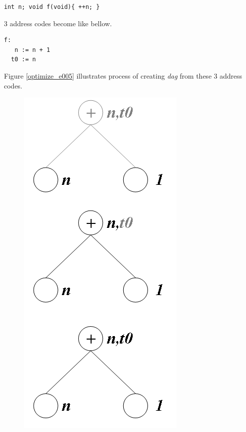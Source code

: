 \begin{Example}
\label{optimize_e006}
\begin{verbatim}
int n; void f(void){ ++n; }
\end{verbatim}
3 address codes become like bellow.
\begin{verbatim}
f:
   n := n + 1
  t0 := n
\end{verbatim}
Figure \ref{optimize_e005} illustrates
process of creating {\em dag} from these 3 address codes.
\begin{figure}[htbp]
\begin{center}
\begin{htmlonly}
\includegraphics[width=0.5\linewidth,height=1.01\linewidth]{opt000.png}
\end{htmlonly}
\begin{latexonly}

\end{latexonly}
\end{center}
\end{figure}
\end{Example}
